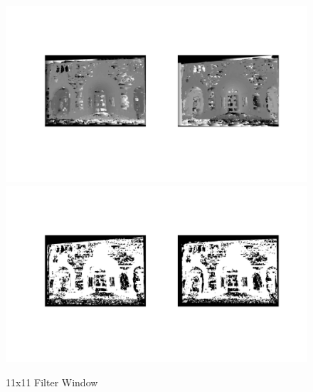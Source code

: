 \documentclass[12pt]{article}
\begin{document}
\begin{figure}[H]
	\centering
	\includegraphics[width=1.1\textwidth]{dc11_1.jpg}
	\includegraphics[width=1.1\textwidth]{dc11_2.jpg}
	\caption{11x11 Filter Window}
	\label{fig1}
\end{figure}
\vspace{5mm}
\end{document}
